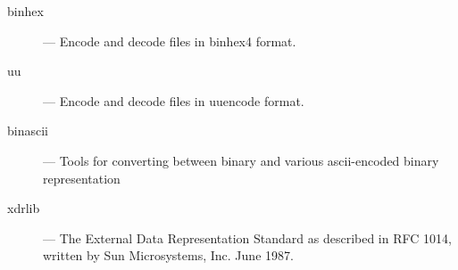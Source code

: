 \begin{description}
\item[binhex]
--- Encode and decode files in binhex4 format.

\item[uu]
--- Encode and decode files in uuencode format.

\item[binascii]
--- Tools for converting between binary and various ascii-encoded binary 
representation

\item[xdrlib]
--- The External Data Representation Standard as described in RFC 1014,
written by Sun Microsystems, Inc. June 1987.

\end{description}
